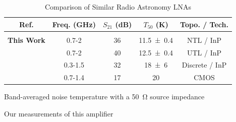 \begin{table}[h!]
    \centering
    \begin{threeparttable}
    \caption{Comparison of Similar Radio Astronomy LNAs}
    \label{tbl:amp_compare}
        \begin{tabular}{c c c c c}
             Ref. & Freq. (GHz) & $S_{21}$ (dB) & $T_{50}$\tnote{1} (K) &  Topo. / Tech. \\
             \hline& \\[-2.0ex]
             \textbf{This Work} & 0.7-2 & 36 & \num{11.5 \pm 0.4} & NTL / InP \\
             \cite{shiRoomTemperatureLowNoiseAmplifier2023} & 0.7-2 & 40 & \num{12.5 \pm 0.4}\tnote{2} & UTL / InP \\
            \cite{lai0315GHzLNAWideband2023} & 0.3-1.5 & 32 & \num{18 \pm 6} & Discrete / InP \\
            \cite{belostotskiSub02DBNoise2007} & 0.7-1.4 & 17 & 20 & CMOS \\
        \end{tabular}
        \begin{tablenotes}
            \item [1] Band-averaged noise temperature with a \qty{50}{\ohm} source impedance
            \item [2] Our measurements of this amplifier
        \end{tablenotes}
    \end{threeparttable}
\end{table}